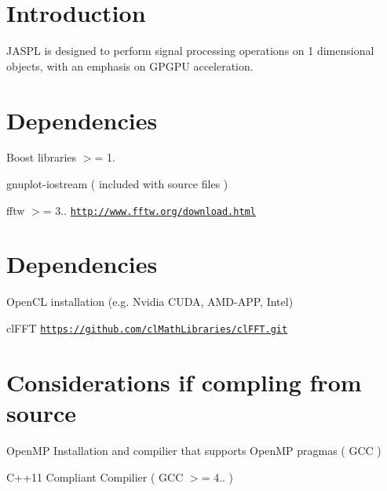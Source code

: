 \hypertarget{index_intro_sec}{}\section{Introduction}\label{index_intro_sec}
J\+A\+S\+PL is designed to perform signal processing operations on 1 dimensional objects, with an emphasis on G\+P\+G\+PU acceleration.\hypertarget{index_Base}{}\section{Dependencies}\label{index_Base}
\begin{DoxyItemize}
\item Boost libraries $>$= 1. \item gnuplot-\/iostream ( included with source files ) \item fftw $>$= 3.. \href{http://www.fftw.org/download.html}{\tt http\+://www.\+fftw.\+org/download.\+html}\end{DoxyItemize}
\hypertarget{index_GPU-acceleration}{}\section{Dependencies}\label{index_GPU-acceleration}
\begin{DoxyItemize}
\item Open\+CL installation (e.\+g. Nvidia C\+U\+DA, A\+M\+D-\/\+A\+PP, Intel) \item cl\+F\+FT \href{https://github.com/clMathLibraries/clFFT.git}{\tt https\+://github.\+com/cl\+Math\+Libraries/cl\+F\+F\+T.\+git}\end{DoxyItemize}
\hypertarget{index_Special}{}\section{Considerations if compling from source}\label{index_Special}
\begin{DoxyItemize}
\item Open\+MP Installation and compilier that supports Open\+MP pragmas ( G\+CC ) \item C++11 Compliant Compilier ( G\+CC $>$= 4.. ) \end{DoxyItemize}
